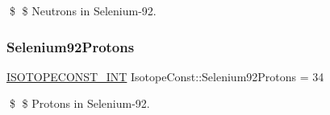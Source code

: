 \$ \$ Neutrons in Selenium-\/92. \mbox{\label{group___isotope_const-_selenium-_se92_ga89e53d72399eeae8fc7c0f737552fd6f}} 
\subsubsection{\texorpdfstring{Selenium92\+Protons}{Selenium92Protons}}
{\footnotesize\ttfamily \mbox{\hyperlink{group___isotope_const-_macros_ga5f18360b3e99483a35c32d789e62621c}{I\+S\+O\+T\+O\+P\+E\+C\+O\+N\+S\+T\+\_\+\+I\+NT}} Isotope\+Const\+::\+Selenium92\+Protons = 34}

\$ \$ Protons in Selenium-\/92. 